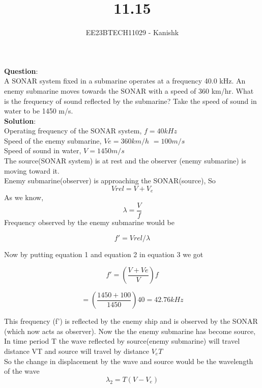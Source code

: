 \documentclass[journal,12pt,twocolumn]{IEEEtran}
\theoremstyle{remark}
\begin{document}

\vspace{3cm}

\title{11.15}
\author{EE23BTECH11029 - Kanishk}
\maketitle
\newpage

\bigskip

\renewcommand{\thefigure}{\theenumi}
\renewcommand{\thetable}{\theenumi}
\textbf{Question}:\\ 
A SONAR system fixed in a submarine operates at a frequency 40.0 kHz. An enemy submarine moves towards the SONAR with a speed of 360 km/hr. What is the frequency of sound reflected by the submarine? Take the speed of sound in water to be 1450 m/s.\\

\textbf{Solution}:\\
Operating frequency of the SONAR system, $f=40kHz$\\
Speed of the enemy submarine, $Ve=360km/h$ $=100m/s$\\
Speed of sound in water, $V=1450 m/s$\\
The source(SONAR system) is at rest and the observer (enemy submarine) is moving toward it. \\
Enemy submarine(observer) is approaching the SONAR(source), So 
\begin{equation}
Vrel=V+V_e
\end{equation}
As we know,
\begin{equation}
\lambda=\frac{V}{f}
\end{equation}
Frequency observed by the enemy submarine would be

\begin{equation}
f'=Vrel/\lambda
\end{equation}

Now by putting equation 1 and equation 2 in equation 3 we got

\begin{equation}
f'=(\frac{V+Ve}{V})f
\end{equation}

$$= (\frac{1450+100}{1450})40=42.76kHz$$

This frequency (f') is reflected by the enemy ship and is observed by the SONAR (which now acts as observer).
Now the the enemy submarine has become source,\\
In time period T the wave reflected by source(enemy submarine) will travel distance VT and source will travel by distance $V_eT$\\
So the change in displacement by the wave and source would be the wavelength of the wave
\begin{equation}
\lambda_2=T(V-V_e)
\end{equation}
\end{document}

